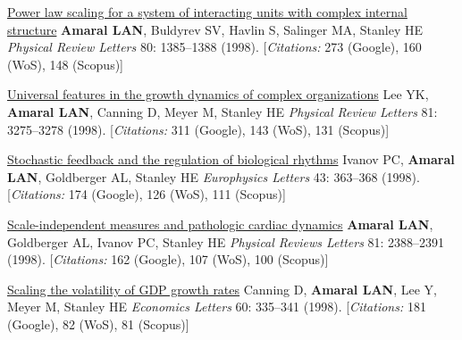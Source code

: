 \NumberedItem{\makebox[0.8cm][r]{[20]}}
\href{/people/amaral/power-law-scaling-for-a-system-of-interacting-units-with-complex-internal-structure}
{Power law scaling for a system of interacting units with complex internal structure}
\newline
{\textbf{Amaral LAN}}, Buldyrev SV, Havlin S, Salinger MA, Stanley HE
\newline
\textit{Physical Review Letters}
    80:
1385--1388 (1998).
    [{\em{Citations:}} 273 (Google), 160 (WoS), 148 (Scopus)]
\newline
\Gap
~
\Gap

\NumberedItem{\makebox[0.8cm][r]{[19]}}
\href{/people/amaral/universal-features-in-the-growth-dynamics-of-complex-organizations}
{Universal features in the growth dynamics of complex organizations}
\newline
Lee YK, {\textbf{Amaral LAN}}, Canning D, Meyer M, Stanley HE
\newline
\textit{Physical Review Letters}
    81:
3275--3278 (1998).
    [{\em{Citations:}} 311 (Google), 143 (WoS), 131 (Scopus)]
\newline
\Gap
~
\Gap

\NumberedItem{\makebox[0.8cm][r]{[18]}}
\href{/people/amaral/stochastic-feedback-and-the-regulation-of-biological-rhythms}
{Stochastic feedback and the regulation of biological rhythms}
\newline
Ivanov PC, {\textbf{Amaral LAN}}, Goldberger AL, Stanley HE
\newline
\textit{Europhysics Letters}
    43:
363--368 (1998).
    [{\em{Citations:}} 174 (Google), 126 (WoS), 111 (Scopus)]
\newline
\Gap
~
\Gap

\NumberedItem{\makebox[0.8cm][r]{[17]}}
\href{/people/amaral/scale-independent-measures-and-pathologic-cardiac-dynamics}
{Scale-independent measures and pathologic cardiac dynamics}
\newline
{\textbf{Amaral LAN}}, Goldberger AL, Ivanov PC, Stanley HE
\newline
\textit{Physical Reviews Letters}
    81:
2388--2391 (1998).
    [{\em{Citations:}} 162 (Google), 107 (WoS), 100 (Scopus)]
\newline
\Gap
~
\Gap

\NumberedItem{\makebox[0.8cm][r]{[16]}}
\href{/people/amaral/scaling-the-volatility-of-gdp-growth-rates}
{Scaling the volatility of GDP growth rates}
\newline
Canning D, {\textbf{Amaral LAN}}, Lee Y, Meyer M, Stanley HE
\newline
\textit{Economics Letters}
    60:
335--341 (1998).
    [{\em{Citations:}} 181 (Google), 82 (WoS), 81 (Scopus)]
\newline
\Gap
~
\Gap

